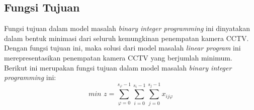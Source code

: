 \subsection{Fungsi Tujuan}
Fungsi tujuan dalam model masalah \textit{binary integer programming} ini dinyatakan dalam bentuk minimasi dari seluruh kemungkinan penempatan kamera CCTV. Dengan fungsi tujuan ini, maka solusi dari model masalah \textit{linear program} ini merepresentasikan penempatan kamera CCTV yang berjumlah minimum. Berikut ini merupakan fungsi tujuan dalam model masalah \textit{binary integer programming} ini:
\begin{equation}
\textit{min }z = \sum_{\varphi=0}^{s_{\varphi}-1} \sum_{i=0}^{s_i-1} \sum_{j=0}^{s_j-1} x_{ij\varphi}
\end{equation}


